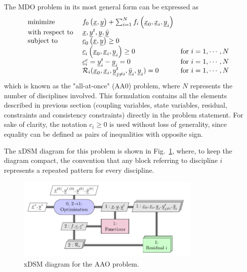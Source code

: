 The MDO problem in its most general form can be expressed as
\begin{equation}
\label{eq:aao_prob}
\begin{array}{l l l}
\textrm{minimize } & f_0\left(\underline{x},\underline{y}\right) + \sum_{i=1}^{N}f_i\left(\underline{x}_0, \underline{x}_i, \underline{y}_i\right) & \\
\textrm{with respect to } & \underline{x}, \underline{y}^t, \underline{y}, \underline{\bar{y}} & \\
\textrm{subject to } & \underline{c}_0\left(\underline{x}, \underline{y}\right)\geq 0 & \\
& \underline{c}_i\left(\underline{x}_0, \underline{x}_i, \underline{y}_i\right) \geq 0 & \textrm{for } i=1,\cdots,N \\
& \underline{c}_i^c = \underline{y}_i^t - \underline{y}_i = 0 & \textrm{for } i=1,\cdots,N \\	
& \mathcal{R}_i(\underline{x}_0,\underline{x}_i,\underline{y}^t_{j\neq i}, \underline{\bar{y}}_i, \underline{y}_i) = 0 & \textrm{for } i=1,\cdots,N \\					 
\end{array}
\end{equation}
which is known as the "all-at-once" (AA0) problem, where $N$ represents the number of disciplines involved. 
This formulation contains all the elements described in previous section (coupling variables, state variables, residual, constraints and consistency constraints) directly in the problem statement. 
For sake of clarity, the notation $c_i \geq 0$ is used without loss of generality, since equality can be defined as pairs of inequalities with opposite sign. 

The xDSM diagram for this problem is shown in Fig.~\ref{fig:aao_arch}, where, to keep the diagram compact, the convention that any block referring to discipline $i$ represents a repeated pattern for every discipline. 
\begin{figure}[!h]
	\centering
	\includegraphics[keepaspectratio, width=0.8\textwidth]{images/app_mdo/AAO}
	\caption{xDSM diagram for the AAO problem.}
	\label{fig:aao_arch}
\end{figure}

